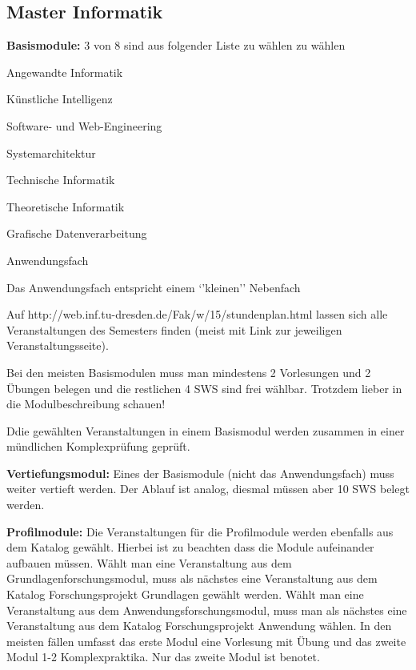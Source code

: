 \documentclass[a4paper,12pt]{report}
\begin{document}
\subsection{Master Informatik}
\begin{itemize*}
	\item \textbf{Basismodule:} 3 von 8 sind aus folgender Liste zu wählen zu wählen
	\begin{itemize*}
		\item Angewandte Informatik 	
		\item Künstliche Intelligenz 	
		\item Software- und Web-Engineering  
		\item Systemarchitektur 	
		\item Technische Informatik 	 
		\item Theoretische Informatik 
		\item Grafische Datenverarbeitung 
		\item Anwendungsfach
	\end{itemize*}	
	\item Das Anwendungsfach entspricht einem `'kleinen'' Nebenfach
	\item Auf http://web.inf.tu-dresden.de/Fak/w/15/stundenplan.html lassen sich alle Veranstaltungen des Semesters finden (meist mit Link zur jeweiligen Veranstaltungsseite).
	\item Bei den meisten Basismodulen muss man mindestens 2 Vorlesungen und 2 Übungen belegen und die restlichen 4 SWS sind frei wählbar. Trotzdem lieber in die Modulbeschreibung schauen!
	\item Ddie gewählten Veranstaltungen in einem Basismodul werden zusammen in einer mündlichen Komplexprüfung geprüft.
	\item \textbf{Vertiefungsmodul:} Eines der Basismodule (nicht das Anwendungsfach) muss weiter vertieft werden. Der Ablauf ist analog, diesmal müssen aber 10 SWS belegt werden.
	\item \textbf{Profilmodule:} Die Veranstaltungen für die Profilmodule werden ebenfalls aus dem Katalog gewählt. Hierbei ist zu beachten dass die Module aufeinander aufbauen müssen. Wählt man eine Veranstaltung aus dem Grundlagenforschungsmodul, muss als nächstes eine Veranstaltung aus dem Katalog Forschungsprojekt Grundlagen gewählt werden. Wählt man eine Veranstaltung aus dem Anwendungsforschungsmodul, muss man als nächstes eine Veranstaltung aus dem Katalog Forschungsprojekt Anwendung wählen. In den meisten fällen umfasst das erste Modul eine Vorlesung mit Übung und das zweite Modul 1-2 Komplexpraktika. Nur das zweite Modul ist benotet.

\end{itemize*}
\end{document}
